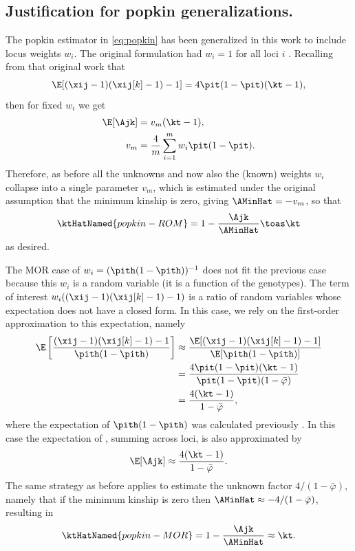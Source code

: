 \documentclass[11pt]{article}
\begin{document}
\begin{appendices}
  \appendix

  \appendixpage
  
  \section{Justification for popkin generalizations.}

  \label{sec:popkin_w_justif}

  The popkin estimator in \cref{eq:popkin} has been generalized in this work to include locus weights $w_i$.
  The original formulation had $w_i=1$ for all loci $i$ \citep{ochoa_estimating_2021}.
  Recalling from that original work that
  $$
  \E[ (\xij-1)(\xij[k]-1) - 1 ] = 4 \pit ( 1 - \pit ) ( \kt - 1 ),
  $$
  then for fixed $w_i$ we get
  \begin{align*}
    \E[ \Ajk ]
    &=
      v_m ( \kt - 1 )
      , \\
    v_m
    &=
      \frac{4}{m} \sum_{i=1}^m w_i \pit ( 1 - \pit )
      .
  \end{align*}
  Therefore, as before all the unknowns \pit and now also the (known) weights $w_i$ collapse into a single parameter $v_m$, which is estimated under the original assumption that the minimum kinship is zero, giving $\AMinHat = -v_m$, so that
  $$
  \ktHatNamed{popkin-ROM}
  =
  1 - \frac{\Ajk}{\AMinHat}
  \toas
  \kt
  $$
  as desired.

  The MOR case of $w_i = (\pith (1-\pith))^{-1}$ does not fit the previous case because this $w_i$ is a random variable (it is a function of the genotypes).
  The term of interest $w_i ( (\xij-1)(\xij[k]-1) - 1 )$ is a ratio of random variables whose expectation does not have a closed form.
  In this case, we rely on the first-order approximation to this expectation, namely
  \begin{align*}
    \E \left[ \frac{ (\xij-1)(\xij[k]-1) - 1 }{ \pith (1-\pith) } \right]
    &\approx
      \frac{ \E[ (\xij-1)(\xij[k]-1) - 1 ] }{ \E[ \pith (1-\pith) ] }
    \\
    &=
      \frac{ 4 \pit ( 1 - \pit ) ( \kt - 1 ) }{ \pit (1-\pit) ( 1 - \bar{\varphi} ) }
    \\
    &=
      \frac{ 4 ( \kt - 1 ) }{ 1 - \bar{\varphi} }
  ,
  \end{align*}
  where the expectation of $\pith (1-\pith)$ was calculated previously \citep{ochoa_estimating_2021}.
  In this case the expectation of \Ajk, summing across loci, is also approximated by
  $$
  \E[ \Ajk ]
  \approx
  \frac{ 4 ( \kt - 1 ) }{ 1 - \bar{\varphi} }
  .
  $$
  The same strategy as before applies to estimate the unknown factor $4 / ( 1- \bar{\varphi} )$, namely that if the minimum kinship is zero then $\AMinHat \approx - 4 / ( 1- \bar{\varphi} )$, resulting in
  $$
  \ktHatNamed{popkin-MOR}
  =
  1 - \frac{\Ajk}{\AMinHat}
  \approx
  \kt
  .
  $$


\end{appendices}
\end{document}
